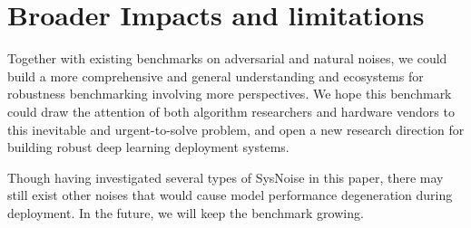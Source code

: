 \begin{table}[htbp]
\centering
\caption{\textbf{Measuring SysNoise on Text-to-Speech Taks.} We record MSE. \emph{The lower} MSE \emph{the better}. }
\label{tab_tts}
\end{table}



\section{Broader Impacts and limitations}
\label{limitations}

Together with existing benchmarks on adversarial and natural noises, we could build a more comprehensive and general understanding and ecosystems for robustness benchmarking involving more perspectives. We hope this benchmark could draw the attention of both algorithm researchers and hardware vendors to this inevitable and urgent-to-solve problem, and open a new research direction for building robust deep learning deployment systems. 

Though having investigated several types of SysNoise in this paper, there may still exist other noises that would cause model performance degeneration during deployment. In the future, we will keep the benchmark growing.



